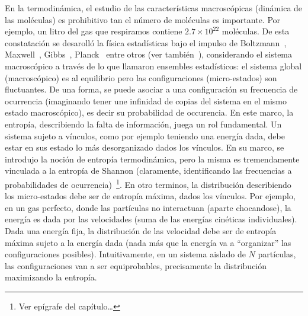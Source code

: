 \label{s:SZ:Desigualdades}




\label{sec:SZ:MaxEnt}

En  la  termodin\'amica, el  estudio  de  las caracter\'isticas  macrosc\'opicas
(din\'amica de las mol\'eculas) es prohibitivo tan el n\'umero de mol\'eculas es
importante. Por  ejemplo, un litro del  gas que respiramos  contiene $2.7 \times
10^{22}$  mol\'eculas.   De  esta  constataci\'on  se  desaroll\'o  la  f\'isica
estad\'isticas    bajo   el    impulso    de   Boltzmann~\cite{Bol96,    Bol98},
Maxwell~\cite{Max67},  Gibbs~\cite{Gib02}, Planck~\cite{Pla15} entre  otros (ver
tambi\'en~\cite[y   ref.]{Jay65,  Mer10,   Mer18}),   considerando  el   sistema
macrosc\'opico  a  trav\'es de  lo  que  llamaron  ensembles estad\'isticos:  el
sistema  global  (macrosc\'opico)  es  al equilibrio  pero  las  configuraciones
(micro-estados)  son  fluctuantes.  De  una   forma,  se  puede  asociar  a  una
configuraci\'on su  frecuencia de ocurrencia (imaginando tener  une infinidad de
copias del sistema en el  mismo estado macrosc\'opico), es decir su probabilidad
de  occurencia.   En  este  marco,  la  entrop\'ia,  describiendo  la  falta  de
informaci\'on, juega un  rol fundamental.  Un sistema sujeto  a v\'inculos, como
por  ejemplo teniendo  una energ\'ia  dada, debe  estar en  sus estado  lo m\'as
desorganizado dados  los v\'inculos.  En su  marco, se introdujo  la noci\'on de
entrop\'ia  termodin\'amica,  pero la  misma  es  tremendamente  vinculada a  la
entrop\'ia   de   Shannon   (claramente,   identificando   las   frecuencias   a
probabilidades  de ocurrencia)~\footnote{Ver  ep\'igrafe  del cap\'itulo\ldots}.
En otro terminos,  la distribuci\'on describiendo los micro-estados  debe ser de
entrop\'ia m\'axima,  dados los  v\'inculos.  Por ejemplo,  en un  gas perfecto,
donde las part\'iculas no interactuan  (aparte chocandose), la energ\'ia es dada
por las velocidades (suma de las energ\'ias cin\'eticas individuales).  Dada una
energ\'ia  fija, la  distribuci\'on  de  las velocidad  debe  ser de  entrop\'ia
m\'axima  sujeto  a  la  energ\'ia  dada  (nada m\'as  que  la  energ\'ia  va  a
``organizar''  las  configuraciones posibles).   Intuitivamente,  en un  sistema
aislado  de  $N$ part\'iculas,  las  configuraciones  van  a ser  equiprobables,
precisamente la distribuci\'on maximizando  la entrop\'ia.  

